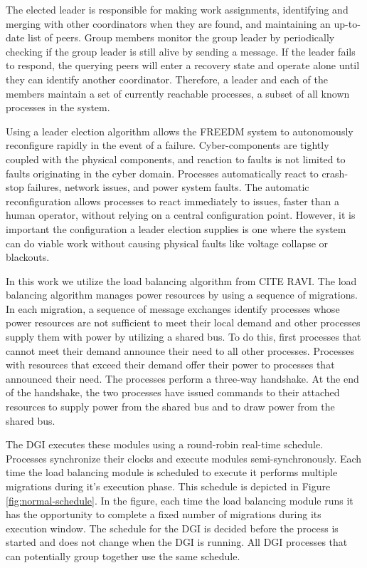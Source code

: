 The elected leader is responsible for making work assignments, identifying and merging with other coordinators when they are found, and maintaining an up-to-date list of peers.
Group members monitor the group leader by periodically checking if the group leader is still alive by sending a message.
If the leader fails to respond, the querying peers will enter a recovery state and operate alone until they can identify another coordinator.
Therefore, a leader and each of the members maintain a set of currently reachable processes, a subset of all known processes in the system.

Using a leader election algorithm allows the FREEDM system to autonomously reconfigure rapidly in the event of a failure.
Cyber-components are tightly coupled with the physical components, and reaction to faults is not limited to faults originating in the cyber domain.
Processes automatically react to crash-stop failures, network issues, and power system faults.
The automatic reconfiguration allows processes to react immediately to issues, faster than a human operator, without relying on a central configuration point.
However, it is important the configuration a leader election supplies is one where the system can do viable work without causing physical faults like voltage collapse or blackouts\cite{HARINI}.

In this work we utilize the load balancing algorithm from CITE RAVI.
The load balancing algorithm manages power resources by using a sequence of migrations.
In each migration, a sequence of message exchanges identify processes whose power resources are not sufficient to meet their local demand and other processes supply them with power by utilizing a shared bus.
To do this, first processes that cannot meet their demand announce their need to all other processes.
Processes with resources that exceed their demand offer their power to processes that announced their need.
The processes perform a three-way handshake.
At the end of the handshake, the two processes have issued commands to their attached resources to supply power from the shared bus and to draw power from the shared bus.

The DGI executes these modules using a round-robin real-time schedule.
Processes synchronize their clocks and execute modules semi-synchronously.
Each time the load balancing module is scheduled to execute it performs multiple migrations during it's execution phase.
This schedule is depicted in Figure \ref{fig:normal-schedule}.
In the figure, each time the load balancing module runs it has the opportunity to complete a fixed number of migrations during its execution window.
The schedule for the DGI is decided before the process is started and does not change when the DGI is running.
All DGI processes that can potentially group together use the same schedule.

